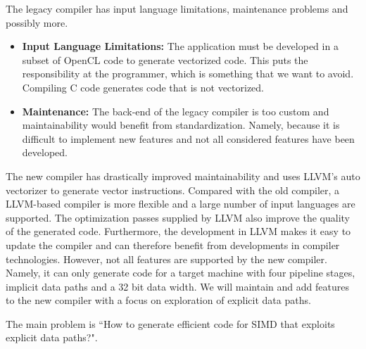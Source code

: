 The legacy compiler has input language limitations, maintenance problems and possibly more.
\begin{itemize}
\item \textbf{Input Language Limitations:} The application must be developed in a subset of OpenCL code to generate vectorized code. This puts the responsibility at the programmer, which is something that we want to avoid. Compiling C code generates code that is not vectorized.   
\item \textbf{Maintenance:} The back-end of the legacy compiler is too custom and maintainability would benefit from standardization. Namely, because it is difficult to implement new features and not all considered features have been developed.   
\end{itemize}

The new compiler has drastically improved maintainability and uses LLVM's auto vectorizer to generate vector instructions. Compared with the old compiler, a LLVM-based compiler is more flexible and a large number of input languages are supported. The optimization passes supplied by LLVM also improve the quality of the generated code. Furthermore, the development in LLVM makes it easy to update the compiler and can therefore benefit from developments in compiler technologies. However, not all features are supported by the new compiler. Namely, it can only generate code for a target machine with four pipeline stages, implicit data paths and a 32 bit data width. We will maintain and add features to the new compiler with a focus on exploration of explicit data paths.

The main problem is ``How to generate efficient code for SIMD that exploits explicit data paths?". 



